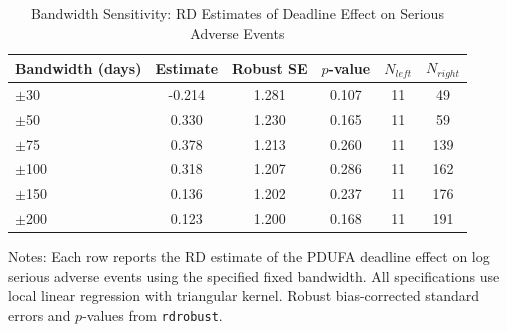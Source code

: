 \begin{table}[H]
\centering
\caption{Bandwidth Sensitivity: RD Estimates of Deadline Effect on Serious Adverse Events}
\begin{threeparttable}
\begin{tabular}{lccccc}
\toprule
Bandwidth (days) & Estimate & Robust SE & $p$-value & $N_{left}$ & $N_{right}$ \\
\midrule
$\pm$30 & -0.214 & 1.281 & 0.107 & 11 & 49 \\
$\pm$50 & 0.330 & 1.230 & 0.165 & 11 & 59 \\
$\pm$75 & 0.378 & 1.213 & 0.260 & 11 & 139 \\
$\pm$100 & 0.318 & 1.207 & 0.286 & 11 & 162 \\
$\pm$150 & 0.136 & 1.202 & 0.237 & 11 & 176 \\
$\pm$200 & 0.123 & 1.200 & 0.168 & 11 & 191 \\
\bottomrule
\end{tabular}
\begin{tablenotes}[flushleft]
\small
\item Notes: Each row reports the RD estimate of the PDUFA deadline effect on log serious adverse events using the specified fixed bandwidth. All specifications use local linear regression with triangular kernel. Robust bias-corrected standard errors and $p$-values from \texttt{rdrobust}.
\end{tablenotes}
\end{threeparttable}
\label{tab:bandwidth}
\end{table}
